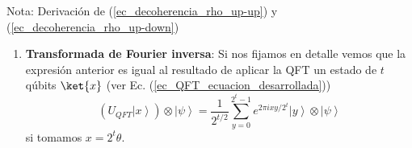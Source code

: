 \documentclass[a4paper,11pt]{book} %
\numberwithin{equation}{chapter}
\def\Lc{\Bigl[}
\def\Rc{\Bigr]}
\begin{document}
\begin{mybox_blue}{Nota: Derivación de (\ref{ec_decoherencia_rho_up-up}) y  (\ref{ec_decoherencia_rho_up-down})}
\begin{enumerate}
	En la notación del convenio estandar, el qúbit más significativo es el primero. En Qiskit es al revés.

Como $U$ es unitaria y $\left| \psi \right\rangle$ es autovector de $U$, aplicar $2^{j}$ veces $U$ se traduce en:
$$
U^{2^{j}} \left| \psi \right\rangle = U^{2^{j}-1} U \left| \psi \right\rangle = U^{2^{j}-1} e^{2 \pi i \theta} \left| \psi \right\rangle = \dots = e^{2 \pi i 2^j \theta} \left| \psi \right\rangle
$$
Usando la relación 
	\begin{align*}
	CU \Lc \left( \left| 0 \right\rangle + \left| 1 \right\rangle \right) \otimes \left| \psi \right\rangle \Rc & =
	CU \Lc \ket{0} \otimes \ket{\psi} + \ket{1} \otimes \ket{\psi} \Rc \\
& = \left| 0 \right\rangle \otimes \left | \psi \right\rangle + \left| 1 \right\rangle \otimes e^{2 \pi i \theta} \left | \psi \right\rangle  \\
& = \left( \left| 0 \right\rangle + e^{2 \pi i \theta} \left| 1 \right\rangle \right) \otimes \left| \psi \right\rangle \,  ,
	\end{align*}
llegamos a
\begin{align*} 
|\Psi_{2}\rangle & =\frac {1}{2^{t/2}} \left(|0\rangle+{e^{{2\pi i} \theta 2^{t-1}}}|1\rangle \right) \otimes \cdots \otimes \left(|0\rangle+{e^{{2\pi i} \theta 2^{1}}}\vert1\rangle \right) \otimes \left(|0\rangle+{e^{2\pi i \theta 2^{0}}}\vert1\rangle \right) \otimes |\psi\rangle \\ 
& = \frac{1}{2^{n/2}}\sum_{y=0}^{2^{t}-1}e^{2\pi i \theta y}|y\rangle \otimes \vert\psi\rangle 
\end{align*}



\begin{mybox_blue}{Nota}
Podemos ver que si por el registro de conteo entra un estado $|z \rangle = | z_{n-1}, z_{n-2}, \dots, z_0 \rangle$, la salida antes de aplicar la QFT$^{-1}$ es de la forma
$$
|z \rangle |\psi \rangle \rightarrow |z \rangle U^{z_{t-1} 2^{t-1}} U^{z_{t-2}2^{t-2}} \dots U^{z_0 2^0} |\psi \rangle = | z \rangle U^{z}  |\psi \rangle
$$
Es decir, lo que se hace es aplicar $z$ veces el operador $U$ sobre el estado $|\psi \rangle$.

\end{mybox_blue}


	\item \textbf{Transformada de Fourier inversa}: Si nos fijamos en detalle vemos que la expresión anterior es igual al resultado de aplicar la QFT un estado de $t$ qúbits $\ket{x}$ (ver Ec. (\ref{ec_QFT_ecuacion_desarrollada}))
$$
\left( U_{QFT} \left| x \right\rangle \right) \otimes \left| \psi \right\rangle = \frac{1}{2^{t/2}} \sum_{y=0}^{2^t-1} e^{2 \pi i xy /2^t} \left| y \right\rangle \otimes \left| \psi \right\rangle 
$$
si tomamos $x = 2^t \theta$. 


\end{enumerate}
\end{mybox_blue}
\end{document}
